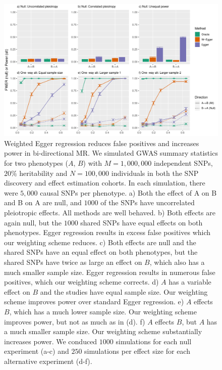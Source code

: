 \documentclass{article}
\begin{document}
\begin{figure}\label{figure1}
\includegraphics[width=\textwidth]{figures/figure1.pdf}
\caption{Weighted Egger regression reduces false positives and increases power
 in bi-directional MR. We simulated GWAS summary statistics for two phenotypes
  ($A$, $B$) with $M=1,000,000$
independent SNPs, $20\%$ heritability and $N = 100,000$ individuals in both
 the SNP discovery and effect estimation cohorts. In each simulation, there
 were $5,000$ causal SNPs per phenotype. a) Both the effect of A on B and B on A are null,
 and $1000$ of the SNPs have uncorrelated pleiotropic effects. All methods are well behaved.
 b) Both effects are again null, but the $1000$ shared SNPs have equal effects on both
 phenotypes. Egger regression results in excess false positives which our weighting scheme
 reduces. c) Both effects are null and the shared SNPs have an equal effect on both phenotypes,
 but the shared SNPs have twice as large an effect on $B$, which also has a much smaller sample
 size. Egger regression results in numerous false positives, which our weighting scheme corrects.
 d) $A$ has a variable effect on $B$ and the studies have equal sample size. Our weighting
 scheme improves power over standard Egger regression. e) $A$ effects $B$, which has a much
 lower sample size. Our weighting scheme improves power, but not as much as in (d). f) $A$
  effects $B$, but $A$ has a much smaller sample size. Our weighting scheme substantially increases
  power. We conduced $1000$ simulations for each null experiment (a-c) and $250$ simulations
  per effect size for each alternative experiment (d-f). }
\end{figure}
\end{document}
